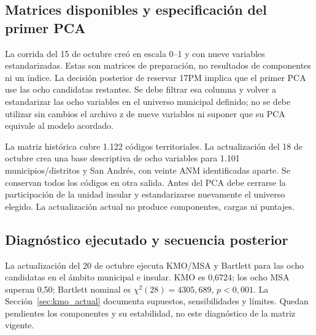 \subsection{Matrices disponibles y especificación del primer PCA}

La corrida del 15 de octubre creó  en escala 0--1 y  con nueve variables estandarizadas. Estas son matrices de preparación, no resultados de componentes ni un índice. La decisión posterior de reservar 17PM implica que el primer PCA use las ocho candidatas restantes. Se debe filtrar esa columna y volver a estandarizar las ocho variables en el universo municipal definido; no se debe utilizar sin cambios el archivo z de nueve variables ni suponer que su PCA equivale al modelo acordado.

La matriz histórica cubre 1.122 códigos territoriales. La actualización del 18 de octubre crea una base descriptiva de ocho variables para 1.101 municipios/distritos y San Andrés, con veinte ANM identificadas aparte. Se conservan todos los códigos en otra salida. Antes del PCA debe cerrarse la participación de la unidad insular y estandarizarse nuevamente el universo elegido. La actualización actual no produce componentes, cargas ni puntajes.

\subsection{Diagnóstico ejecutado y secuencia posterior}

La actualización del 20 de octubre ejecuta KMO/MSA y Bartlett para las ocho candidatas en el ámbito municipal e insular. KMO es 0,6724; los ocho MSA superan 0,50; Bartlett nominal es $\chi^2(28)=4305{,}689$, $p<0,001$. La Sección~\ref{sec:kmo_actual} documenta supuestos, sensibilidades y límites. Quedan pendientes los componentes y su estabilidad, no este diagnóstico de la matriz vigente.

